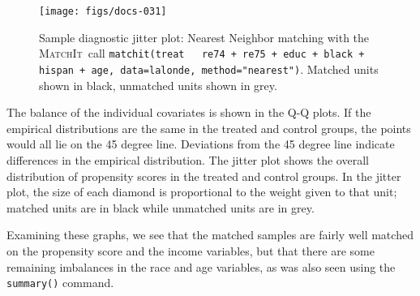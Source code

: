 \documentclass[oneside,letterpaper,titlepage]{article}
\newcommand{\MatchIt}{\textsc{MatchIt}}
\begin{document}
\begin{figure}[tbp]
  \begin{center}
\texttt{[image: figs/docs-031]}
    \hfill
    \caption{Sample diagnostic jitter plot: Nearest Neighbor matching
      with the \MatchIt\ call \texttt{matchit(treat ~ re74 + re75 +
        educ + black + hispan + age, data=lalonde, method="nearest")}.
      Matched units shown in black, unmatched units shown in grey.}
    \label{diagjitternn}
  \end{center}
\end{figure}

The balance of the individual covariates is shown in the Q-Q plots.
If the empirical distributions are the same in the treated and control
groups, the points would all lie on the 45 degree line.  Deviations
from the 45 degree line indicate differences in the empirical
distribution.  The jitter plot shows the overall distribution of
propensity scores in the treated and control groups.  In the jitter
plot, the size of each diamond is proportional to the weight given to
that unit; matched units are in black while unmatched units are in
grey.

Examining these graphs, we see that the matched samples are fairly
well matched on the propensity score and the income variables, but
that there are some remaining imbalances in the race and age
variables, as was also seen using the \texttt{summary()} command.
\end{document}
